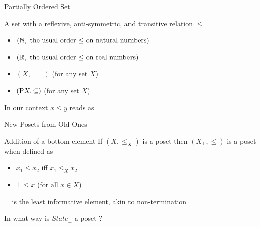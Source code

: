 \documentclass{beamer}
\begin{document}
\begin{frame}{Partially Ordered Set}

        \begin{definition}[Poset]
                A set with a reflexive, anti-symmetric, and transitive
                relation $\leq$
        \end{definition}

        \begin{examples}
                \begin{itemize}
                        \item $(\mathbb{N}, \text{ the usual order $\leq$ on natural numbers})$
                        \item $(\mathbb{R}, \text{ the usual order $\leq$ on real numbers})$
                        \item $(X, \> \> =)$ \small{(for any set $X$)}
                        \item $(\mathrm{P} X, \subseteq)$ \small{(for any set $X$)}
                \end{itemize}
        \end{examples}

        \pause
        \smallskip
        In our context $x \leq y$ reads as
        \begin{center}
        \end{center}
\end{frame}

\begin{frame}{New Posets from Old Ones}

        \begin{block}{Addition of a bottom element}
                If $(X, \leq_X)$ is a poset then $(X_\bot, \leq)$ is
                a poset when defined as
                \begin{itemize}
                        \item $x_1 \leq x_2$  iff $x_1 \leq_X x_2$
                        \item $\bot \leq x$ ($\text{for all } x \in X$)
                \end{itemize}
        \end{block}

        $\bot$ is the least informative element, akin to non-termination

        \pause
        \medskip
        \begin{example}
                In what way is $State_\bot$ a poset ?
        \end{example}
\end{frame}
\end{document}

